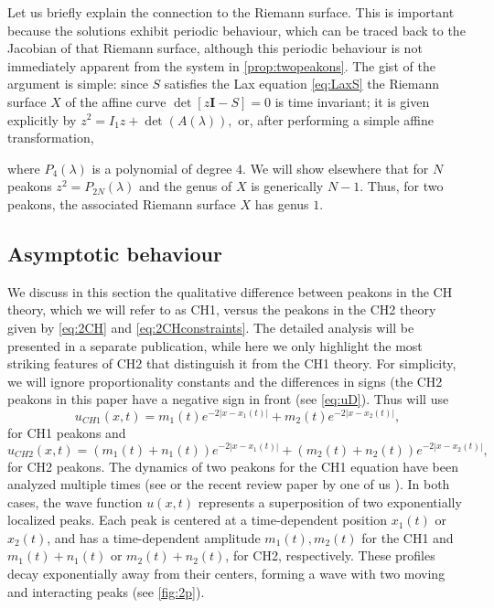 \documentclass[10pt,a4paper]{article}
\numberwithin{equation}{section}
\theoremstyle{plain}
\theoremstyle{definition}
\newcommand{\abs}[1]{\left\lvert #1 \right\rvert}
\renewcommand{\l}{\lambda}
\begin{document}
Let us briefly explain the connection to the Riemann surface. This is important because the solutions exhibit periodic behaviour, which can be traced back to the Jacobian of that Riemann surface, although this periodic behaviour is not immediately apparent from the system in 
\autoref{prop:twopeakons}.  
The gist of the argument is simple: since $S$ satisfies the Lax equation \eqref{eq:LaxS} 
the Riemann surface $X$ of the affine curve 
$\det[ z\mathbf I -S]=0$ is time invariant; it is given explicitly by $
z^2=I_1 z+\det(A(\l)), $ or, after performing a simple affine transformation, 
\begin{center} 
\end{center} 
where $P_4(\l)$ is a polynomial of degree $4$.  
We will show elsewhere that for $N$ peakons $z^2=P_{2N}(\l)$ and the genus of $X$ is 
generically $N-1$.  Thus, for two peakons, the associated Riemann surface $X$ has genus $1$.  

\subsection{Asymptotic behaviour} 
We discuss in this section the qualitative difference between peakons in the CH theory, which we will refer to as CH1, versus the peakons in the CH2 theory given by \eqref{eq:2CH} and \eqref{eq:2CHconstraints}.  
The detailed analysis will be presented in a separate publication, while here we only highlight the most striking features of CH2 that distinguish it from the CH1 theory.  
For simplicity, we will ignore proportionality constants and the differences in signs (the CH2 peakons in this paper have a negative sign in front (see \eqref{eq:uD}).  Thus will use 
\begin{equation} 
u_{CH1} (x,t)=m_1(t) e^{-2\abs{x-x_1(t)}} +m_2(t) e^{-2\abs{x-x_2(t)}}, 
\end{equation} 
for CH1 peakons and 
\begin{equation} 
u_{CH2} (x,t) = (m_1(t) + n_1(t)) e^{-2|x - x_1(t)|} + (m_2(t) + n_2(t)) e^{-2|x - x_2(t)|},
\end{equation} 
for CH2 peakons.  The dynamics of two peakons for the CH1 equation have been analyzed multiple times (see \cite{camassa-holm} or the recent review paper by one of us \cite{lundmark-szmigielski:review}).  In both cases, the wave function
$u(x,t)$ 
represents a superposition of two exponentially localized peaks. Each peak is centered at a time-dependent position \( x_1(t) \) or \( x_2(t) \), and has a time-dependent amplitude $m_1(t), m_2(t)$ for the CH1 and  \( m_1(t) + n_1(t) \) or \( m_2(t) + n_2(t) \), for CH2, respectively. These profiles decay exponentially away from their centers, forming a wave with two moving and interacting peaks (see \autoref{fig:2p}).   
\end{document}
